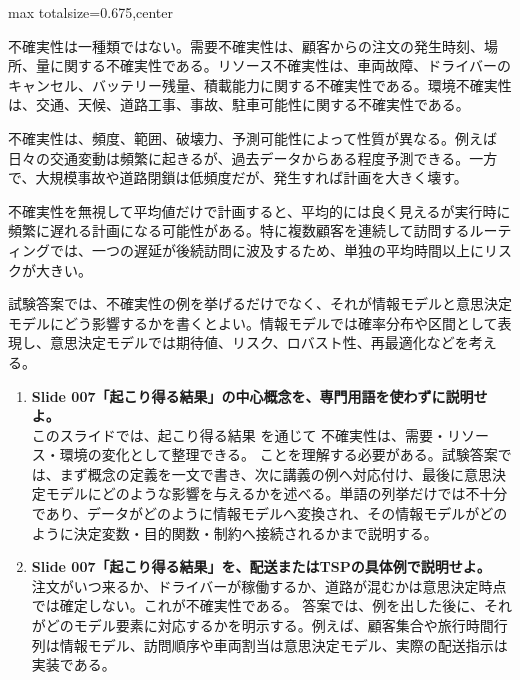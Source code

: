 \begin{adjustbox}{max totalsize={\textwidth}{0.675\textheight},center}
\begin{minipage}{\textwidth}
\begin{minipage}[t]{0.485\textwidth}
不確実性は一種類ではない。需要不確実性は、顧客からの注文の発生時刻、場所、量に関する不確実性である。リソース不確実性は、車両故障、ドライバーのキャンセル、バッテリー残量、積載能力に関する不確実性である。環境不確実性は、交通、天候、道路工事、事故、駐車可能性に関する不確実性である。\par
不確実性は、頻度、範囲、破壊力、予測可能性によって性質が異なる。例えば日々の交通変動は頻繁に起きるが、過去データからある程度予測できる。一方で、大規模事故や道路閉鎖は低頻度だが、発生すれば計画を大きく壊す。\par
不確実性を無視して平均値だけで計画すると、平均的には良く見えるが実行時に頻繁に遅れる計画になる可能性がある。特に複数顧客を連続して訪問するルーティングでは、一つの遅延が後続訪問に波及するため、単独の平均時間以上にリスクが大きい。\par
試験答案では、不確実性の例を挙げるだけでなく、それが情報モデルと意思決定モデルにどう影響するかを書くとよい。情報モデルでは確率分布や区間として表現し、意思決定モデルでは期待値、リスク、ロバスト性、再最適化などを考える。\par
{}
\begin{enumerate}
\item \textbf{Slide 007「起こり得る結果」の中心概念を、専門用語を使わずに説明せよ。}\\このスライドでは、起こり得る結果 を通じて 不確実性は、需要・リソース・環境の変化として整理できる。 ことを理解する必要がある。試験答案では、まず概念の定義を一文で書き、次に講義の例へ対応付け、最後に意思決定モデルにどのような影響を与えるかを述べる。単語の列挙だけでは不十分であり、データがどのように情報モデルへ変換され、その情報モデルがどのように決定変数・目的関数・制約へ接続されるかまで説明する。
\item \textbf{Slide 007「起こり得る結果」を、配送またはTSPの具体例で説明せよ。}\\注文がいつ来るか、ドライバーが稼働するか、道路が混むかは意思決定時点では確定しない。これが不確実性である。 答案では、例を出した後に、それがどのモデル要素に対応するかを明示する。例えば、顧客集合や旅行時間行列は情報モデル、訪問順序や車両割当は意思決定モデル、実際の配送指示は実装である。
\end{enumerate}
\end{minipage}
\end{minipage}
\end{adjustbox}

